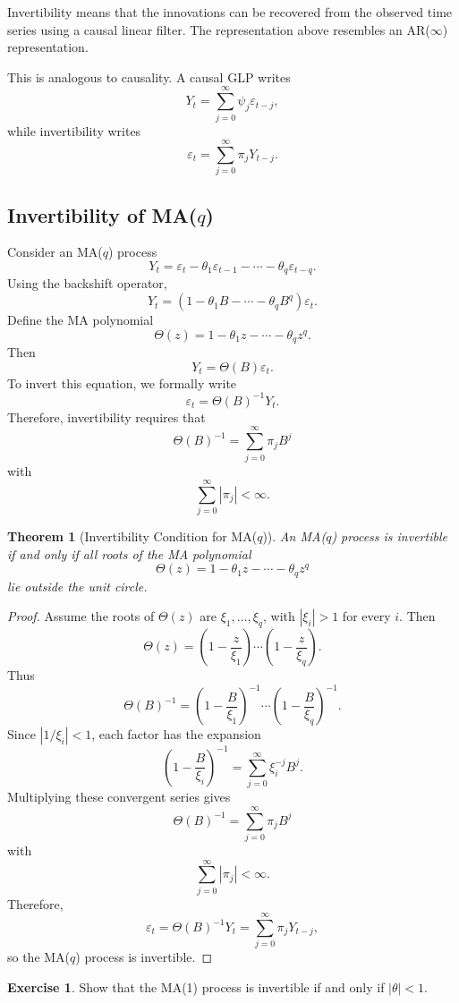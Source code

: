\documentclass[12pt,oneside]{book}
\numberwithin{equation}{section}
\theoremstyle{definition}
\newtheorem{exercise}{Exercise}[section]
\theoremstyle{plain}
\newtheorem{theorem}{Theorem}[section]
\theoremstyle{remark}
\begin{document}
Invertibility means that the innovations can be recovered from the observed time series using a causal linear filter. The representation above resembles an AR($\infty$) representation.

This is analogous to causality. A causal GLP writes
\[
Y_t
=
\sum_{j=0}^{\infty}\psi_j\varepsilon_{t-j},
\]
while invertibility writes
\[
\varepsilon_t
=
\sum_{j=0}^{\infty}\pi_jY_{t-j}.
\]

\subsection*{Invertibility of MA($q$)}

Consider an MA($q$) process
\[
Y_t
=
\varepsilon_t-\theta_1\varepsilon_{t-1}
-\cdots
-\theta_q\varepsilon_{t-q}.
\]
Using the backshift operator,
\[
Y_t
=
(1-\theta_1B-\cdots-\theta_qB^q)\varepsilon_t.
\]
Define the MA polynomial
\[
\Theta(z)=1-\theta_1z-\cdots-\theta_qz^q.
\]
Then
\[
Y_t=\Theta(B)\varepsilon_t.
\]
To invert this equation, we formally write
\[
\varepsilon_t=\Theta(B)^{-1}Y_t.
\]
Therefore, invertibility requires that
\[
\Theta(B)^{-1}
=
\sum_{j=0}^{\infty}\pi_jB^j
\]
with
\[
\sum_{j=0}^{\infty}|\pi_j|<\infty.
\]

\begin{theorem}[Invertibility Condition for MA($q$)]
An MA($q$) process is invertible if and only if all roots of the MA polynomial
\[
\Theta(z)=1-\theta_1z-\cdots-\theta_qz^q
\]
lie outside the unit circle.
\end{theorem}

\begin{proof}
Assume the roots of $\Theta(z)$ are $\xi_1,\ldots,\xi_q$, with $|\xi_i|>1$ for every $i$. Then
\[
\Theta(z)
=
\left(1-\frac{z}{\xi_1}\right)
\cdots
\left(1-\frac{z}{\xi_q}\right).
\]
Thus
\[
\Theta(B)^{-1}
=
\left(1-\frac{B}{\xi_1}\right)^{-1}
\cdots
\left(1-\frac{B}{\xi_q}\right)^{-1}.
\]
Since $|1/\xi_i|<1$, each factor has the expansion
\[
\left(1-\frac{B}{\xi_i}\right)^{-1}
=
\sum_{j=0}^{\infty}\xi_i^{-j}B^j.
\]
Multiplying these convergent series gives
\[
\Theta(B)^{-1}
=
\sum_{j=0}^{\infty}\pi_jB^j
\]
with
\[
\sum_{j=0}^{\infty}|\pi_j|<\infty.
\]
Therefore,
\[
\varepsilon_t
=
\Theta(B)^{-1}Y_t
=
\sum_{j=0}^{\infty}\pi_jY_{t-j},
\]
so the MA($q$) process is invertible.
\end{proof}

\begin{exercise}
Show that the MA(1) process is invertible if and only if $|\theta|<1$.
\end{exercise}
\end{document}
